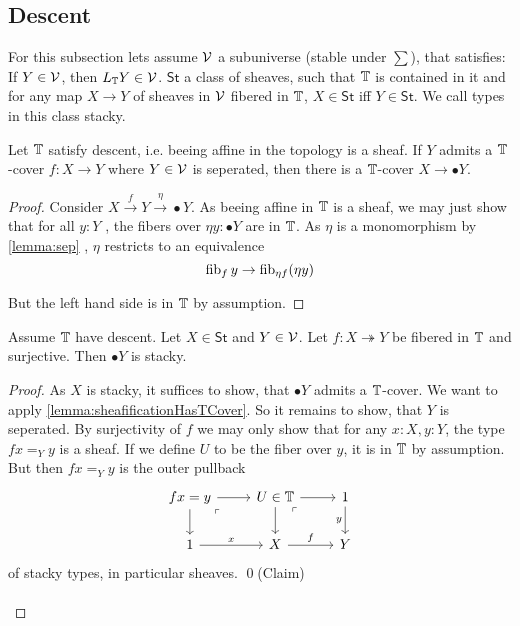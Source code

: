 \documentclass{article}
\newcommand{\St}{\mathsf{St}}
\begin{document}
\subsection{Descent}
For this subsection lets assume $\mathcal{V}$ a subuniverse (stable under $\sum$), that satisfies: If $Y \in \mathcal{V}$, then $L_{\mathbb{T}} Y \in \mathcal{V}$.  $\St$ a class of sheaves, such that $\mathbb{T}$ is contained in it and for any map $X \to Y$ of sheaves in $\mathcal{V}$ fibered in $\mathbb{T}$, $X \in \St$ iff $Y \in \St$. We call types in this class stacky.
\begin{lemma}{\label{lemma:sheafificationHasTCover}}
	Let $\mathbb{T}$ satisfy descent, i.e. beeing affine in the topology is a sheaf. If $Y$ admits a $\mathbb{T}$-cover $f : X \to Y$ where $Y \in \mathcal{V}$ is seperated, then there is a $\mathbb{T}$-cover $X \to \bullet Y$.
\end{lemma}
\begin{proof}
	
	Consider $X \overset{f}{\to} Y \overset{\eta}{\to} \bullet Y$. As beeing affine in $\mathbb{T}$ is  a sheaf, we may just show that for all $y : Y$ , the fibers over $\eta y : \bullet Y$ are in $\mathbb{T}$. As $\eta$ is a monomorphism by \ref{lemma:sep} , $\eta$ restricts to an equivalence
	\[
	\operatorname{fib}_f y \to \operatorname{fib}_{ \eta f}(\eta y)
	\]
	
	But the left hand side is in $\mathbb{T}$ by assumption. 
\end{proof}
\begin{lemma}
 Assume $\mathbb{T}$ have descent.
Let $X \in \St$ and $Y \in \mathcal{V}$.	Let $f : X \twoheadrightarrow Y$ be fibered in $\mathbb{T}$ and surjective. Then $\bullet Y$ is stacky.
\end{lemma}
\begin{proof}
As $X$ is stacky, it suffices to show, that $\bullet Y$ admits a $\mathbb{T}$-cover.
We want to apply \ref{lemma:sheafificationHasTCover}. So it remains to show, that $Y$ is seperated. By surjectivity of $f$ we may only show that for any $x : X, y : Y$, the type $f x =_Y y$ is a sheaf. If we define $U$ to be the fiber over $y$, it is in $\mathbb{T}$ by assumption. But then $f x =_Y y$ is the outer pullback
\[\begin{tikzcd}
	{f x = y} & {U \in\bT} & 1 \\
	\arrow["\ulcorner"{anchor=center, pos=0.125}, draw=none, from=1-1, to=2-2]
	1 & X & Y
	\arrow[from=1-1, to=1-2]
	\arrow[from=1-1, to=2-1]
	\arrow[from=1-2, to=1-3]
	\arrow[from=1-2, to=2-2]
	\arrow["\ulcorner"{anchor=center, pos=0.125}, draw=none, from=1-2, to=2-3]
	\arrow["y"', from=1-3, to=2-3]
	\arrow["x", from=2-1, to=2-2]
	\arrow["f", from=2-2, to=2-3]
\end{tikzcd}\]
of stacky types, in particular sheaves. \qed(Claim) \\\\

\end{proof}
\end{document}

